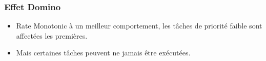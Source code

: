 \documentclass[ignorenonframetext,]{beamer}
\begin{document}
\begin{frame}\frametitle{Effet Domino}

\begin{itemize}
\item
  Rate Monotonic à un meilleur comportement, les tâches de priorité
  faible sont affectées les premières.
\item
  Mais certaines tâches peuvent ne jamais être exécutées.
\end{itemize}

\begin{center}

\begin{RTGrid}[width=10cm]{4}{24}









\end{RTGrid}

\end{center}

\end{frame}
\end{document}
